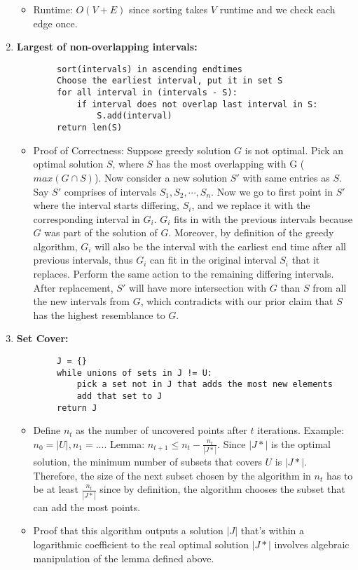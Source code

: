 \begin{enumerate}
        \begin{itemize}
            \item Runtime: $O(V+E)$ since sorting takes $V$ runtime and we check each edge once.
        \end{itemize}

        \item \textbf{Largest of non-overlapping intervals: }
        \begin{verbatim}
        sort(intervals) in ascending endtimes
        Choose the earliest interval, put it in set S
        for all interval in (intervals - S):
            if interval does not overlap last interval in S:
                S.add(interval)
        return len(S)
        \end{verbatim}
        \begin{itemize}
            \item Proof of Correctness: Suppose greedy solution $G$ is not optimal. Pick an optimal solution $S$, where $S$ has the most overlapping with G ($max(G\cap S)$). Now consider a new solution $S'$ with same entries as $S$. Say $S'$ comprises of intervals $S_1, S_2, \cdots, S_n$. Now we go to first point in $S'$ where the interval starts differing, $S_i$, and we replace it with the corresponding interval in $G_i$. $G_i$ fits in with the previous intervals because $G$ was part of the solution of $G$. Moreover, by definition of the greedy algorithm, $G_i$ will also be the interval with the earliest end time after all previous intervals, thus $G_i$ can fit in the original interval $S_i$ that it replaces. Perform the same action to the remaining differing intervals. After replacement, $S'$ will have more intersection with $G$ than $S$ from all the new intervals from $G$, which contradicts with our prior claim that $S$ has the highest resemblance to $G$.
        \end{itemize}

        \item \textbf{Set Cover: }
        \begin{verbatim}
        J = {}
        while unions of sets in J != U:
            pick a set not in J that adds the most new elements
            add that set to J
        return J
        \end{verbatim}
        \begin{itemize}
            \item Define $n_t$ as the number of uncovered points after $t$ iterations. Example: $n_0=|U|, n_1=...$. Lemma: $n_{t+1}\leq n_t - \frac{n_t}{|J*|}$. Since $|J*|$ is the optimal solution, the minimum number of subsets that covers $U$ is $|J*|$. Therefore, the size of the next subset chosen by the algorithm in $n_t$ has to be at least $\frac{n_t}{|J*|}$ since by definition, the algorithm chooses the subset that can add the most points.
            
            \item Proof that this algorithm outputs a solution $|J|$ that's within a logarithmic coefficient to the real optimal solution $|J*|$ involves algebraic manipulation of the lemma defined above.
        \end{itemize}
    \end{enumerate}


